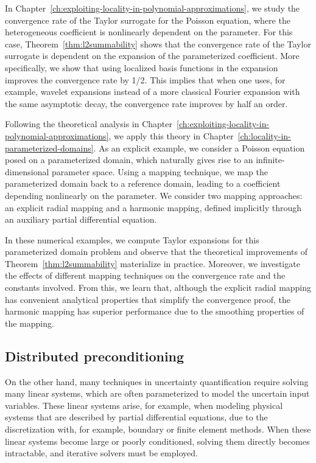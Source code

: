In Chapter~\ref{ch:exploiting-locality-in-polynomial-approximations}, we study the convergence rate of the Taylor surrogate for the Poisson equation, where the heterogeneous coefficient is nonlinearly dependent on the parameter.
For this case, Theorem~\ref{thm:l2summability} shows that the convergence rate of the Taylor surrogate is dependent on the expansion of the parameterized coefficient.
More specifically, we show that using localized basis functions in the expansion improves the convergence rate by 1/2.
This implies that when one uses, for example, wavelet expansions instead of a more classical Fourier expansion with the same asymptotic decay, the convergence rate improves by half an order.

Following the theoretical analysis in Chapter~\ref{ch:exploiting-locality-in-polynomial-approximations}, we apply this theory in Chapter~\ref{ch:locality-in-parameterized-domains}.
As an explicit example, we consider a Poisson equation posed on a parameterized domain, which naturally gives rise to an infinite-dimensional parameter space.
Using a mapping technique, we map the parameterized domain back to a reference domain, leading to a coefficient depending nonlinearly on the parameter.
We consider two mapping approaches: an explicit radial mapping and a harmonic mapping, defined implicitly through an auxiliary partial differential equation.

In these numerical examples, we compute Taylor expansions for this parameterized domain problem and observe that the theoretical improvements of Theorem~\ref{thm:l2summability} materialize in practice.
Moreover, we investigate the effects of different mapping techniques on the convergence rate and the constants involved.
From this, we learn that, although the explicit radial mapping has convenient analytical properties that simplify the convergence proof, the harmonic mapping has superior performance due to the smoothing properties of the mapping.

\subsection*{Distributed preconditioning}\label{subsec:distributed-preconditioning}
On the other hand, many techniques in uncertainty quantification require solving many linear systems, which are often parameterized to model the uncertain input variables.
These linear systems arise, for example, when modeling physical systems that are described by partial differential equations, due to the discretization with, for example, boundary or finite element methods.
When these linear systems become large or poorly conditioned, solving them directly becomes intractable, and iterative solvers must be employed.


